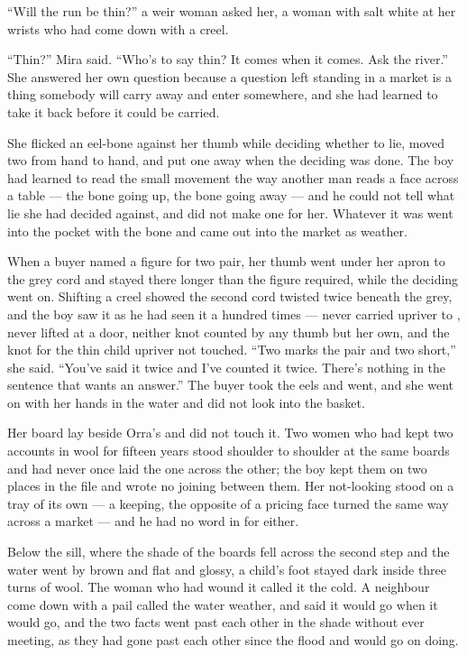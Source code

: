 “Will the run be thin?” a weir woman asked her, a woman with salt white at her wrists who had come down with a creel.

“Thin?” Mira said. “Who's to say thin? It comes when it comes. Ask the river.” She answered her own question because a question left standing in a market is a thing somebody will carry away and enter somewhere, and she had learned to take it back before it could be carried.

She flicked an eel-bone against her thumb while deciding whether to lie, moved two from hand to hand, and put one away when the deciding was done. The boy had learned to read the small movement the way another man reads a face across a table --- the bone going up, the bone going away --- and he could not tell what lie she had decided against, and did not make one for her. Whatever it was went into the pocket with the bone and came out into the market as weather.

When a buyer named a figure for two pair, her thumb went under her apron to the grey cord and stayed there longer than the figure required, while the deciding went on. Shifting a creel showed the second cord twisted twice beneath the grey, and the boy saw it as he had seen it a hundred times --- never carried upriver to , never lifted at a door, neither knot counted by any thumb but her own, and the knot for the thin child upriver not touched. “Two marks the pair and two short,” she said. “You've said it twice and I've counted it twice. There's nothing in the sentence that wants an answer.” The buyer took the eels and went, and she went on with her hands in the water and did not look into the basket.

Her board lay beside Orra's and did not touch it. Two women who had kept two accounts in wool for fifteen years stood shoulder to shoulder at the same boards and had never once laid the one across the other; the boy kept them on two places in the file and wrote no joining between them. Her not-looking stood on a tray of its own --- a keeping, the opposite of a pricing face turned the same way across a market --- and he had no word in  for either.

\scenebreak

Below the sill, where the shade of the boards fell across the second step and the water went by brown and flat and glossy, a child's foot stayed dark inside three turns of wool. The woman who had wound it called it the cold. A neighbour come down with a pail called the water weather, and said it would go when it would go, and the two facts went past each other in the shade without ever meeting, as they had gone past each other since the flood and would go on doing.

